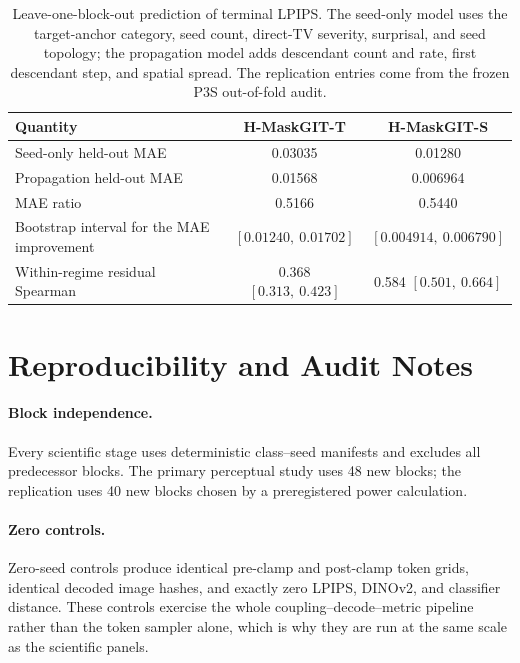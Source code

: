\documentclass[11pt,a4paper]{article}
\theoremstyle{plain}
\theoremstyle{definition}
\theoremstyle{remark}
\begin{document}
\begin{table}[h]
\centering
\caption{Leave-one-block-out prediction of terminal LPIPS. The seed-only model
uses the target-anchor category, seed count, direct-TV severity, surprisal, and seed topology; the
propagation model adds descendant count and rate, first descendant step, and
spatial spread. The replication entries come from the frozen P3S out-of-fold audit.}
\label{tab:lobo}
\small
\begin{tabular}{@{}lcc@{}}
\toprule
Quantity & H-MaskGIT-T & H-MaskGIT-S \\
\midrule
Seed-only held-out MAE & 0.03035 & 0.01280 \\
Propagation held-out MAE & 0.01568 & 0.006964 \\
MAE ratio & 0.5166 & 0.5440 \\
Bootstrap interval for the MAE improvement & $[0.01240,\ 0.01702]$ & $[0.004914,\ 0.006790]$ \\
Within-regime residual Spearman & 0.368 $[0.313,\ 0.423]$ & 0.584 $[0.501,\ 0.664]$ \\
\bottomrule
\end{tabular}
\end{table}

\section{Reproducibility and Audit Notes}
\label{app:audit}

\paragraph{Block independence.} Every scientific stage uses deterministic
class--seed manifests and excludes all predecessor blocks. The primary perceptual
study uses 48 new blocks; the replication uses 40 new blocks chosen by a
preregistered power calculation.

\paragraph{Zero controls.} Zero-seed controls produce identical pre-clamp and
post-clamp token grids, identical decoded image hashes, and exactly zero LPIPS,
DINOv2, and classifier distance. These controls exercise the whole
coupling--decode--metric pipeline rather than the token sampler alone, which is
why they are run at the same scale as the scientific panels.
\end{document}
